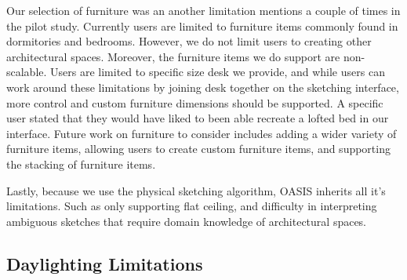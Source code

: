 	Our selection of furniture was an another limitation mentions a couple of times in the pilot study.
	Currently users are limited to furniture items commonly found in dormitories and bedrooms. However, we do not limit users to creating other architectural spaces. Moreover, the furniture items we do support are non-scalable. Users are limited to specific size desk we provide, and while users can work around these limitations by joining desk together on the sketching interface, more control and custom furniture dimensions should be supported. A specific user stated that they would have liked to been able recreate a lofted bed in our interface. Future work on furniture to consider includes adding a wider variety of furniture items, allowing users to create custom furniture items, and supporting the stacking of furniture items.


	Lastly, because we use the physical sketching algorithm, OASIS inherits all it's limitations. Such as only supporting flat ceiling, and difficulty in interpreting ambiguous sketches that require domain knowledge of architectural spaces.



\subsection{Daylighting Limitations}



